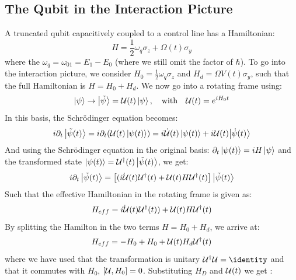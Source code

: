 \subsection{The Qubit in the Interaction Picture}
A truncated qubit capacitively coupled to a control line has a Hamiltonian:
\begin{equation}\label{eq:qubit_hamilton}
    H = \frac{1}{2} \omega_{q} \sigma_z + \Omega(t) \sigma_y
\end{equation}
where the $\omega_q = \omega_{01} = E_1 - E_0$ (where we still omit the factor of $\hbar$). 
To go into the interaction picture, we consider $H_0 = \frac{1}{2} \omega_{q} \sigma_z$ and $H_d = \Omega V(t) \sigma_y$, such that the full Hamiltonian is $H = H_0 + H_d$. We now go into a rotating frame using:
\begin{equation}
    \ket{\psi} \to \ket{\tilde{\psi}} = \mathcal{U}(t)\ket{\psi}, \quad \text{with}\quad \mathcal{U}(t) = e^{iH_0 t}
\end{equation}
In this basis, the Schrödinger equation becomes:
\begin{align*}
    i\partial_t \ket{\tilde{\psi}(t)} = i \partial_t (\mathcal{U}(t) \ket{{\psi}(t)})= i \dot{\mathcal{U}}(t)\ket{\psi(t)} + i \mathcal{U}(t) {\ket{\Dot{{\psi}}(t)}}
\end{align*}
And using the Schrödinger equation in the original basis: $\partial_t\ket{\psi(t)} = i H \ket{\psi}$ and the transformed state $\ket{\psi(t)} = \mathcal{U}^\dagger(t) \ket{\tilde{\psi}(t)}$, we get:
\begin{equation}
    i \partial_t \ket{\Tilde{\psi}(t)}= \left[(\dot{i \mathcal{U}}{(t)}\mathcal{U}^\dagger(t) + \mathcal{U}(t) H \mathcal{U}^\dagger(t)\right]\ket{\tilde{\psi}(t)}
\end{equation}
Such that the effective Hamiltonian in the rotating frame is given as:
\begin{equation}
    H_{eff} = \dot{i \mathcal{U}}{(t)}\mathcal{U}^\dagger(t)) + \mathcal{U}(t) H \mathcal{U}^\dagger(t)
\end{equation}
By splitting the Hamilton in the two terms $H = H_0+H_d$, we arrive at:
\begin{equation}
    H_{eff} = - H_0 + H_0 + \mathcal{U}(t) H_d \mathcal{U}^\dagger(t)
\end{equation}
where we have used that the transformation is unitary $\unitary^\dagger \unitary = \identity$ and that it commutes with $H_0$,  $\comm{\unitary}{H_0} = 0$. Substituting $H_D$ and $\mathcal{U}(t)$ we get \cite{krantz_quantum_2019}:
